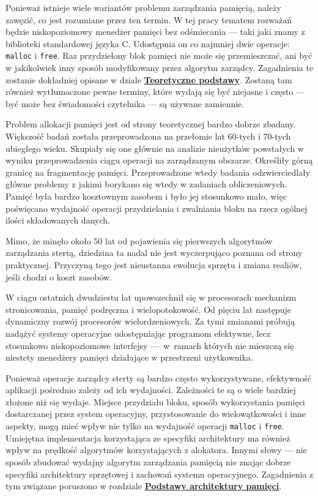 \documentclass[12pt,a4paper,titlepage,twoside]{mwart}
\begin{document}
Ponieważ istnieje wiele wariantów problemu zarządzania pamięcią, należy
zawęzić, co jest rozumiane przez ten termin. W tej pracy tematem rozważań
będzie niskopoziomowy menedżer pamięci bez odśmiecania --- taki jaki znamy z
biblioteki standardowej języka C. Udostępnia on co najmniej dwie operacje:
\texttt{malloc} i \texttt{free}. Raz przydzielony blok pamięci nie może się
przemieszczać, ani być w jakikolwiek inny sposób modyfikowany przez algorytm
zarządcy. Zagadnienia te zostanie dokładniej opisane w dziale
\hyperlink{Teoria}{\textbf{Teoretyczne podstawy}}. Zostaną tam również
wytłumaczone pewne terminy, które wydają się być niejasne i często --- być może
bez świadomości czytelnika --- są używane zamiennie.

Problem allokacji pamięci jest od strony teoretycznej bardzo dobrze zbadany.
Większość badań została przeprowadzona na przełomie lat 60-tych i 70-tych
ubiegłego wieku. Skupiały się one głównie na analizie nieużytków powstałych w
wyniku przeprowadzenia ciągu operacji na zarządzanym obszarze. Określiły górną
granicę na fragmentację pamięci. Przeprowadzone wtedy badania odzwierciedlały
główne problemy z jakimi borykano się wtedy w zadaniach obliczeniowych. Pamięć
była bardzo kosztownym zasobem i było jej stosunkowo mało, więc poświęcano
wydajność operacji przydzielania i zwalniania bloku na rzecz ogólnej ilości
składowanych danych.

Mimo, że minęło około 50 lat od pojawienia się pierwszych algorytmów
zarządzania stertą, dziedzina ta nadal nie jest wyczerpująco poznana od strony
praktycznej. Przyczyną tego jest nieustanna ewolucja sprzętu i zmiana realiów,
jeśli chodzi o koszt zasobów.

W ciągu ostatnich dwudziestu lat upowszechnił się w procesorach mechanizm
stronicowania, pamięć podręczna i wielopotokowość. Od pięciu lat następuje
dynamiczny rozwój procesorów wielordzeniowych. Za tymi zmianami próbują nadążyć
systemy operacyjne udostępniając programom efektywne, lecz stosunkowo
niskopoziomowe interfejsy ---~w~ramach których nie mieszczą się niestety
menedżery pamięci działające w przestrzeni użytkownika.

Ponieważ operacje zarządcy sterty są bardzo często wykorzystywane,
efektywność aplikacji pośrednio zależy od ich wydajności. Zależności te są o
wiele bardziej złożone niż się wydaje. Miejsce przydziału bloku, sposób
wykorzystania pamięci dostarczanej przez system operacyjny, przystosowanie do
wielowątkowości i inne aspekty, mogą mieć wpływ nie tylko na wydajność operacji
\texttt{malloc} i \texttt{free}. Umiejętna implementacja korzystająca ze
specyfiki architektury ma również wpływ na prędkość algorytmów korzystających z
alokatora. Innymi słowy --- nie sposób zbudować wydajny algorytm zarządzania
pamięcią nie znając dobrze specyfiki architektury sprzętowej i zachowań systemu
operacyjnego. Zagadnienia z tym związane poruszono w rozdziale
\hyperlink{Architektura}{\textbf{Podstawy architektury pamięci}}.
\end{document}
